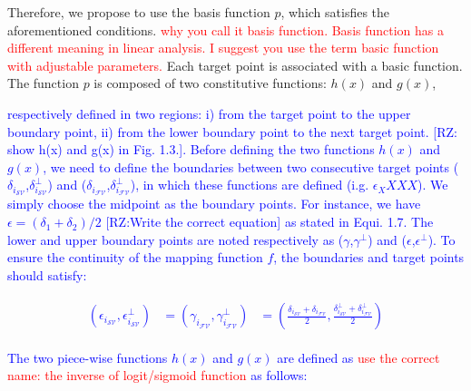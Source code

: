 Therefore, we propose to use the basis function $p$, which satisfies the aforementioned conditions. \textcolor{red}{why you call it basis function. Basis function has a different meaning in linear analysis. I suggest you use the term basic function with adjustable parameters.} Each target point is associated with a basic function. 
The function $p$ is composed of two constitutive functions: $h(x)$ and $g(x)$, \textcolor{blue}{respectively defined in two regions: i) from the target point to the upper boundary point, ii) from the lower boundary point to the next target point. [RZ: show h(x) and g(x) in Fig. 1.3.]. 
Before defining the two functions $h(x)$ and $g(x)$, we need to define the boundaries between two consecutive target points  ($\delta_{i_{{\mathcal{SV}}}}$,$\delta^{\perp}_{i_{{\mathcal{SV}}}}$) and ($\delta_{i_{{\mathcal{FV}}}}$,$\delta^{\perp}_{i_{{\mathcal{FV}}}}$), in which these functions are defined (i.g. $\epsilon_XXXX$). We simply choose the midpoint as the boundary points. For instance, we have $\epsilon=(\delta_1+\delta_2)/2$ [RZ:Write the correct equation] as stated in Equi. 1.7.
The lower and upper boundary points are noted respectively as ($\gamma$,$\gamma^{\perp}$) and ($\epsilon$,$\epsilon^{\perp}$). To ensure the continuity of the mapping function $f$, the boundaries and target points should satisfy:
 

\begin{align}
\begin{aligned}
(\epsilon_{i_{{\mathcal{SV}}}},\epsilon^{\perp}_{i_{{\mathcal{SV}}}}) &=
(\gamma_{i_{{\mathcal{FV}}}},\gamma^{\perp}_{i_{{\mathcal{FV}}}}) &=
(\frac{\delta_{i_{{\mathcal{SV}}}} + \delta_{i_{{\mathcal{FV}}}}}{2}, \frac{\delta^{\perp}_{i_{{\mathcal{SV}}}} + \delta^{\perp}_{i_{{\mathcal{FV}}}}}{2})
\end{aligned}
\end{align}

The two piece-wise functions $h(x)$ and $g(x)$ are defined as \textcolor{red}{use the correct name: the inverse of logit/sigmoid function} as follows:

}
